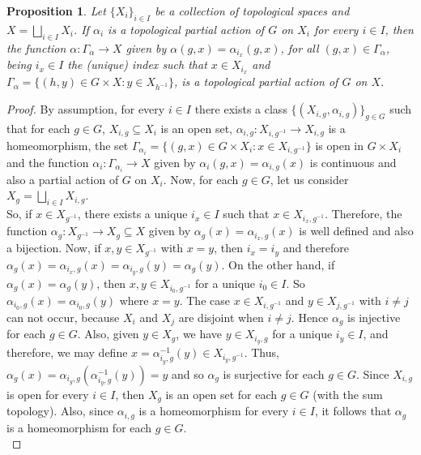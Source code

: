 \documentclass[sn-mathphys-num]{sn-jnl}%
\theoremstyle{thmstyleone}%
\newtheorem{proposition}[theorem]{Proposition}%
\theoremstyle{thmstyletwo}%
\theoremstyle{thmstylethree}%
\begin{document}
\begin{proposition}\label{PartialActionSum}
Let $ \{X_i \}_{i \in I} $ be a collection of topological spaces and $ X = \bigsqcup_{i \in I} X_i $. If $ \alpha_i $ is a topological partial  action of $ G $ on $ X_i$ for every $i\in I$, then the function $ \alpha: \Gamma_\alpha \to X $ given by $ \alpha(g, x) = \alpha_{i_x}(g , x)$, for all 
$ (g, x) \in \Gamma_{\alpha}$, being $i_x\in I$ the (unique) index such that $x\in X_{i_x}$ and $\Gamma_{\alpha} = \{(h, y) \in G \times X: y \in X_{h^{-1}}\}$, is a topological  partial action of $ G $ on $X$. 
\end{proposition}
\begin{proof}
By assumption, for every $ i \in I $ there exists a class $ \{(X_{i, g}, \alpha_{i, g}) \}_{g \in G} $ such that for each $ g \in G $, $ X_ {i, g} \subseteq X_i$  is an open set, $ \alpha_{i, g}: X_{i, g^{- 1}} \to X_{i, g} $ is a homeomorphism, the set $ \Gamma_{\alpha_i} = \{(g, x) \in G \times X_i: x \in X_{i, g^{- 1}}\}$ is open in $ G \times X_i $ and the function $ \alpha_i: \Gamma_{\alpha_i} \to X $ given by $ \alpha_i (g, x) = \alpha_{i, g} (x) $ is continuous and also a partial action  of $ G $ on $ X_i $.
Now, for each $ g \in G $, let us consider $ X_{g} = \bigsqcup_ {i \in I} X_{i, g} $.\\

So, if $ x \in X_ {g^{- 1}} $, there exists a unique $ i_x \in I $ such that $ x \in X_ {i_x, g^{- 1}} $.
Therefore, the function $ \alpha_ {g}: X_{g^{- 1}} \to X_{g} \subseteq X $ given by $ \alpha_ {g} (x) = \alpha_{i_x, g} (x ) $ is well defined and also a bijection.
Now, if $ x, y \in X_{g ^ {- 1}} $ with $ x = y $, then $ i_x = i_y $ and therefore $ \alpha_{g} (x) = \alpha_{i_x, g} (x) = \alpha_{i_y, g} (y) = \alpha_ {g} (y) $.
On the other hand, if $ \alpha_{g} (x) = \alpha_ {g} (y) $, then $ x, y \in X_{i_0, g^{- 1}} $ for a unique $ i_0 \in I $.
So $ \alpha_{i_0, g} (x) = \alpha_ {i_0, g} (y) $ where $ x = y $.
The case $ x \in X_ {i, g^{- 1}} $ and $ y \in X_ {j, g^{- 1}} $ with $ i \neq j $ can not occur, because $ X_i $ and $ X_j $ are disjoint when $ i \neq j $.
Hence $ \alpha_g $ is injective for each $ g \in G $.
Also, given $ y \in X_ {g} $, we have $ y \in X_ {i_y, g} $ for a unique $ i_y \in I $, and therefore,  we may define $ x = \alpha_ {i_y, g}^{-1}(y) \in X_{i_y, g^{- 1}} $.
Thus, $ \alpha_g (x) = \alpha_ {i_y, g} (\alpha_{i_y, g}^{- 1}(y)) = y $ and so $ \alpha_g $ is surjective for each $ g \in G $.
Since $ X_ {i, g} $ is open for every $ i \in I $, then $ X_g $ is an open set for each $ g \in G $ (with the sum topology).
Also, since $ \alpha_ {i, g} $ is a homeomorphism for every $ i \in I $, it follows that $ \alpha_g $ is a homeomorphism for each $ g \in G $.\\



\end{proof}
\end{document}

